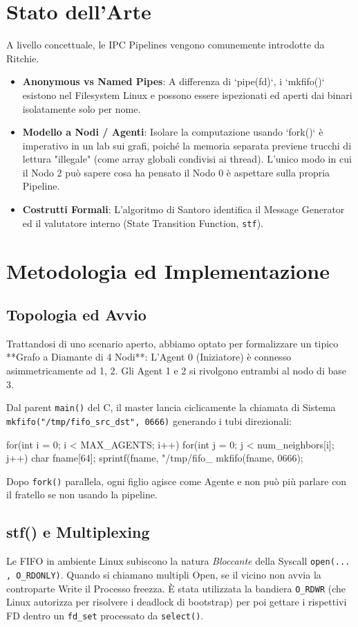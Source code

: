 \documentclass[a4paper,12pt]{article}
\begin{document}
\section{Stato dell'Arte}
A livello concettuale, le IPC Pipelines vengono comunemente introdotte da Ritchie. 
\begin{itemize}
    \item \textbf{Anonymous vs Named Pipes}: A differenza di `pipe(fd)`, i `mkfifo()` esistono nel Filesystem Linux e possono essere ispezionati ed aperti dai binari isolatamente solo per nome.
    \item \textbf{Modello a Nodi / Agenti}: Isolare la computazione usando `fork()` è imperativo in un lab sui grafi, poiché la memoria separata previene trucchi di lettura "illegale" (come array globali condivisi ai thread). L'unico modo in cui il Nodo 2 può sapere cosa ha pensato il Nodo 0 è aspettare sulla propria Pipeline.
    \item \textbf{Costrutti Formali}: L'algoritmo di Santoro identifica il Message Generator ed il valutatore interno (State Transition Function, \texttt{stf}).
\end{itemize}

\section{Metodologia ed Implementazione}

\subsection{Topologia ed Avvio}
Trattandosi di uno scenario aperto, abbiamo optato per formalizzare un tipico **Grafo a Diamante di 4 Nodi**: L'Agent 0 (Iniziatore) è connesso asimmetricamente ad {1, 2}. Gli Agent 1 e 2 si rivolgono entrambi al nodo di base {3}.

Dal parent \texttt{main()} del C, il master lancia ciclicamente la chiamata di Sistema \texttt{mkfifo("/tmp/fifo\_src\_dst", 0666)} generando i tubi direzionali:
\begin{ccode}
for(int i = 0; i < MAX_AGENTS; i++) {
    for(int j = 0; j < num_neighbors[i]; j++) {
        char fname[64];
        sprintf(fname, "/tmp/fifo_%
        mkfifo(fname, 0666);
    }
}
\end{ccode}
Dopo \texttt{fork()} parallela, ogni figlio agisce come Agente e non può più parlare con il fratello se non usando la pipeline.

\subsection{stf() e Multiplexing}
Le FIFO in ambiente Linux subiscono la natura \textit{Bloccante} della Syscall \texttt{open(... , O\_RDONLY)}. Quando si chiamano multipli Open, se il vicino non avvia la controparte Write il Processo freezza. È stata utilizzata la bandiera \texttt{O\_RDWR} (che Linux autorizza per risolvere i deadlock di bootstrap) per poi gettare i rispettivi FD dentro un \texttt{fd\_set} processato da \texttt{select()}.
\end{document}
